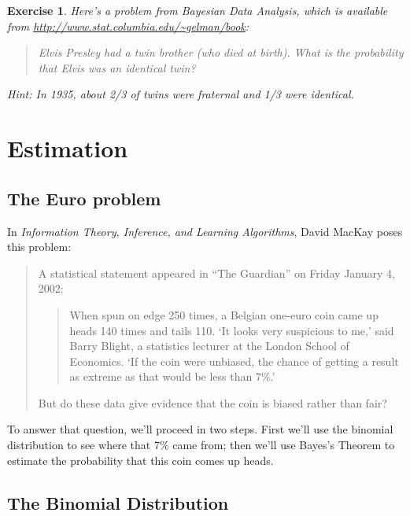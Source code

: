 \documentclass[12pt]{book}
\theoremstyle{exercise}
\newtheorem{exercise}{Exercise}[chapter]
\begin{document}
\begin{exercise}
Here's a problem from {\it Bayesian Data Analysis}, which is available from \url{http://www.stat.columbia.edu/~gelman/book}:

\begin{quote}
Elvis Presley had a twin brother (who died at birth). What is the probability that Elvis was an identical twin?
\end{quote}

Hint: In 1935, about 2/3 of twins were fraternal and 1/3 were identical.
\end{exercise}


\chapter{Estimation}
\label{more}



\section{The Euro problem}
\label{euro}

In {\it Information Theory, Inference, and Learning Algorithms}, David MacKay poses this problem:

\begin{quote}
A statistical statement appeared in ``The Guardian'' on Friday January 4, 2002:

  \begin{quote}
        When spun on edge 250 times, a Belgian one-euro coin came
        up heads 140 times and tails 110.  `It looks very suspicious
        to me,' said Barry Blight, a statistics lecturer at the London
        School of Economics.  `If the coin were unbiased, the chance of
        getting a result as extreme as that would be less than 7\%.'
        \end{quote}

But do these data give evidence that the coin is biased rather than fair?
\end{quote}

To answer that question, we'll proceed in two steps.
First we'll use the binomial distribution to see where that 7\% came from; then we'll use Bayes's Theorem to estimate the probability that this coin comes up heads.


\section{The Binomial Distribution}
\label{binomial}
\end{document}
